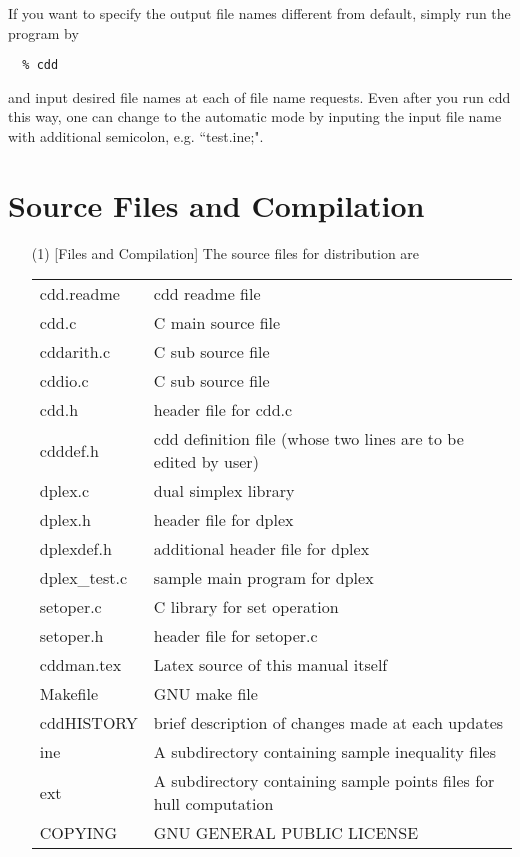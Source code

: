 If you want to specify the output file names
different from default, simply run the program by
\begin{verbatim}
  % cdd
\end{verbatim}
and input desired file names at each of file name requests.
Even after you run cdd this way, one can 
change to the automatic mode by inputing the input file 
name with additional semicolon, e.g. ``test.ine;".

\section{Source Files and Compilation}  \label{CAUTIONS}

\begin{itemize}
\item[(1)] [Files and Compilation] The source files for distribution are

\begin{tabular}{ll}
     cdd.readme  &  cdd readme file\\
     cdd.c       &   C main source file\\
     cddarith.c  &   C sub source file\\  
     cddio.c  &   C sub source file\\  
     cdd.h       &   header file for cdd.c\\
     cdddef.h    &   cdd definition file (whose two lines are to be edited by user)\\
      dplex.c      &  dual simplex library\\
     dplex.h       & header file for dplex\\
     dplexdef.h    & additional header file for dplex\\
     dplex\_test.c  & sample main program for dplex\\
     setoper.c   &   C library for set operation\\
     setoper.h   &   header file for setoper.c \\
     cddman.tex  &  Latex source of this manual itself\\
     Makefile &   GNU make file\\
     cddHISTORY  &   brief description of changes made at each updates\\
     ine         &   A subdirectory containing sample inequality files\\
     ext         &   A subdirectory containing sample points files for hull computation\\
     COPYING     &   GNU GENERAL PUBLIC LICENSE
\end{tabular}


\end{itemize}
